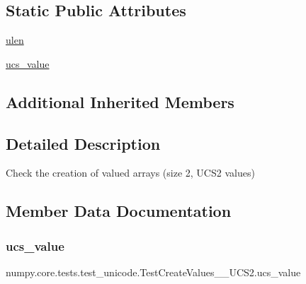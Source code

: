 \subsection*{Static Public Attributes}
\begin{DoxyCompactItemize}
\item 
\hyperlink{classnumpy_1_1core_1_1tests_1_1test__unicode_1_1TestCreateValues__2__UCS2_af9d14b791ba0d8f79fa3f98d58587a9f}{ulen}
\item 
\hyperlink{classnumpy_1_1core_1_1tests_1_1test__unicode_1_1TestCreateValues__2__UCS2_a1c26bdfa1bd20695450eee0e4bfa4e97}{ucs\+\_\+value}
\end{DoxyCompactItemize}
\subsection*{Additional Inherited Members}


\subsection{Detailed Description}
\begin{DoxyVerb}Check the creation of valued arrays (size 2, UCS2 values)\end{DoxyVerb}
 

\subsection{Member Data Documentation}
\mbox{\label{classnumpy_1_1core_1_1tests_1_1test__unicode_1_1TestCreateValues__2__UCS2_a1c26bdfa1bd20695450eee0e4bfa4e97}} 
\subsubsection{\texorpdfstring{ucs\+\_\+value}{ucs\_value}}
{\footnotesize\ttfamily numpy.\+core.\+tests.\+test\+\_\+unicode.\+Test\+Create\+Values\+\_\+\_\+\+U\+C\+S2.\+ucs\+\_\+value\hspace{0.3cm}{\ttfamily [static]}}

